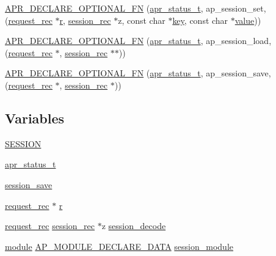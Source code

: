\begin{DoxyCompactItemize}
\item 
\hyperlink{group__MOD__SESSION_ga1d460a1eefa6d2d55ca3ef3888004762}{A\+P\+R\+\_\+\+D\+E\+C\+L\+A\+R\+E\+\_\+\+O\+P\+T\+I\+O\+N\+A\+L\+\_\+\+FN} (\hyperlink{group__apr__errno_gaa5105fa83cc322f09382292db8b47593}{apr\+\_\+status\+\_\+t}, ap\+\_\+session\+\_\+set,(\hyperlink{structrequest__rec}{request\+\_\+rec} $\ast$\hyperlink{pcregrep_8txt_a2e9e9438b26c0bb4425367a7e4f75eb3}{r}, \hyperlink{structsession__rec}{session\+\_\+rec} $\ast$z, const char $\ast$\hyperlink{apr__siphash_8h_adac0b6a30345ea1d0daa8a692b0b7ad9}{key}, const char $\ast$\hyperlink{pcretest_8txt_a262ad32c75be9b93a7a77b045ed14fe0}{value}))
\item 
\hyperlink{group__MOD__SESSION_gad72df63fa5b561f2c5bd49719587277a}{A\+P\+R\+\_\+\+D\+E\+C\+L\+A\+R\+E\+\_\+\+O\+P\+T\+I\+O\+N\+A\+L\+\_\+\+FN} (\hyperlink{group__apr__errno_gaa5105fa83cc322f09382292db8b47593}{apr\+\_\+status\+\_\+t}, ap\+\_\+session\+\_\+load,(\hyperlink{structrequest__rec}{request\+\_\+rec} $\ast$, \hyperlink{structsession__rec}{session\+\_\+rec} $\ast$$\ast$))
\item 
\hyperlink{group__MOD__SESSION_ga2e98ebc4d2c632772f9155ff491bbe36}{A\+P\+R\+\_\+\+D\+E\+C\+L\+A\+R\+E\+\_\+\+O\+P\+T\+I\+O\+N\+A\+L\+\_\+\+FN} (\hyperlink{group__apr__errno_gaa5105fa83cc322f09382292db8b47593}{apr\+\_\+status\+\_\+t}, ap\+\_\+session\+\_\+save,(\hyperlink{structrequest__rec}{request\+\_\+rec} $\ast$, \hyperlink{structsession__rec}{session\+\_\+rec} $\ast$))
\end{DoxyCompactItemize}
\subsection*{Variables}
\begin{DoxyCompactItemize}
\item 
\hyperlink{group__MOD__SESSION_ga356e6480f30ba4f9ad049df5ef391cb0}{S\+E\+S\+S\+I\+ON}
\item 
\hyperlink{group__MOD__SESSION_gaff82c227817510542b1ed4677fb40f27}{apr\+\_\+status\+\_\+t}
\item 
\hyperlink{group__MOD__SESSION_ga26d7816f280bd1e89cd6f2690e825dd1}{session\+\_\+save}
\item 
\hyperlink{structrequest__rec}{request\+\_\+rec} $\ast$ \hyperlink{group__MOD__SESSION_ga8e035f911fe2b3d40f1b5310172f378e}{r}
\item 
\hyperlink{structrequest__rec}{request\+\_\+rec} \hyperlink{structsession__rec}{session\+\_\+rec} $\ast$z \hyperlink{group__MOD__SESSION_ga07aa3887eead1c519d2441a9a2449c8c}{session\+\_\+decode}
\item 
\hyperlink{group__APACHE__CORE__CONFIG_ga0ea4f633a5f9f88e1603aaeb1f2b2e69}{module} \hyperlink{ap__config_8h_ae2cb2b956e7f274f8d91581331debbe0}{A\+P\+\_\+\+M\+O\+D\+U\+L\+E\+\_\+\+D\+E\+C\+L\+A\+R\+E\+\_\+\+D\+A\+TA} \hyperlink{group__MOD__SESSION_ga0788cae1e5b29614b9a1d976483a5c94}{session\+\_\+module}
\end{DoxyCompactItemize}


